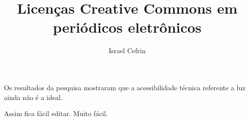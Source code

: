 \documentclass[11pt, oneside]{article}   	%
\title{Licenças Creative Commons em periódicos eletrônicos}
\author{Israel Cefrin}
\date{\displaydate{date}}
\begin{document}
\maketitle

Os resultados da pesquisa mostraram que a acessibilidade técnica referente a luz ainda não é a ideal.

Assim fica fácil editar.
Muito fácil.
\end{document}

